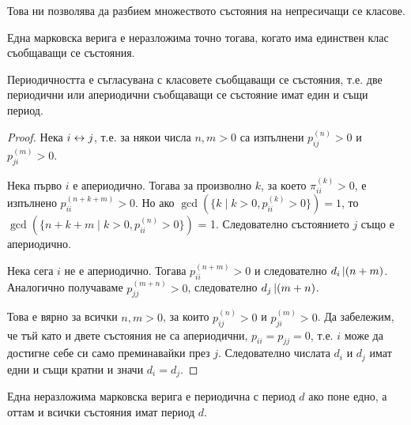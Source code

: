 \documentclass[numbers=endperiod, bibliography=totocnumbered]{scrartcl}
\begin{document}
Това ни позволява да разбием множеството състояния на непресичащи се класове.

\begin{corollary}
  Една марковска верига е неразложима точно тогава, когато има единствен клас съобщаващи се състояния.
\end{corollary}

\begin{proposition}
  Периодичността е съгласувана с класовете съобщаващи се състояния, т.е. две периодични или апериодични съобщаващи се състояние имат един и същи период.
\end{proposition}
\begin{proof}
  Нека \( i \leftrightarrow j \), т.е. за някои числа \( n, m > 0 \) са изпълнени \( p_{ij}^{(n)} > 0 \) и \( p_{ji}^{(m)} > 0 \).

  Нека първо \( i \) е апериодично. Тогава за произволно \( k \), за което \( \pi_{ii}^{(k)} > 0 \), е изпълнено \( p_{ii}^{(n+k+m)} > 0 \). Но ако \( \gcd (\{ k \mid k > 0, p_{ii}^{(k)} > 0 \}) = 1 \), то \( \gcd (\{ n+k+m \mid k > 0, p_{ii}^{(n)} > 0 \}) \) = 1. Следователно състоянието \( j \) също е апериодично.

  Нека сега \( i \) не е апериодично. Тогава \( p_{ii}^{(n+m)} > 0 \) и следователно \( d_i \operatorname{\vert} (n+m) \). Аналогично получаваме \( p_{jj}^{(m+n)} > 0 \), следователно \( d_j \operatorname{\vert} (m+n) \).

  Това е вярно за всички \( n, m > 0 \), за които \( p_{ij}^{(n)} > 0 \) и \( p_{ji}^{(m)} > 0 \). Да забележим, че тъй като и двете състояния не са апериодични, \( p_{ii} = p_{jj} = 0 \), т.е. \( i \) може да достигне себе си само преминавайки през \( j \). Следователно числата \( d_i \) и \( d_j \) имат едни и същи кратни и значи \( d_i = d_j \).
\end{proof}

\begin{corollary}
  Една неразложима марковска верига е периодична с период \( d \) ако поне едно, а оттам и всички състояния имат период \( d \).
\end{corollary}
\end{document}
